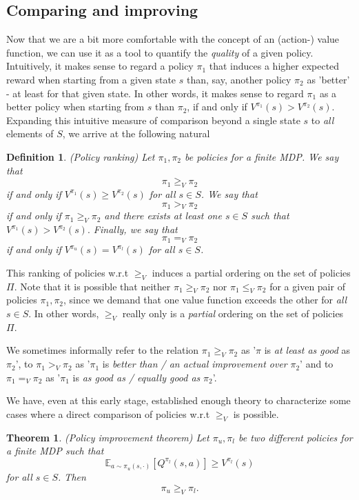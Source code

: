 \documentclass[11pt]{article} %
\newtheorem{thm}{Theorem}
\newtheorem{defn}{Definition}
\begin{document}
\subsection{Comparing and improving}

Now that we are a bit more comfortable with the concept of an (action-) value function, we can use it as a tool to quantify the \textit{quality} of a given policy. Intuitively, it makes sense to regard a policy $\pi_1$ that induces a higher expected reward when starting from a given state $s$ than, say, another policy $\pi_2$ as 'better'  - at least for that given state. In other words, it makes sense to regard $\pi_1$ as a better policy when starting from $s$ than $\pi_2$, if and only if $V^{\pi_1}(s) > V^{\pi_2}(s)$. Expanding this intuitive measure of comparison beyond a single state $s$ to \textit{all} elements of $S$, we arrive at the following natural

\begin{defn}{(Policy ranking)}
Let $\pi_1, \pi_2$ be policies for a finite MDP. We say that $$\pi_1 \ge_V \pi_2$$ if and only if $V^{\pi_1}(s) \ge V^{\pi_2}(s)$ for all $s \in S$. We say that $$\pi_1 >_V \pi_2$$ if and only if  $\pi_1 \ge_V \pi_2$ and there exists at least one $s \in S$ such that $V^{\pi_1}(s) > V^{\pi_2}(s).$ Finally, we say that $$\pi_1 =_V \pi_2$$ if and only if $V^{\pi_u}(s) = V^{\pi_l}(s)$ for all $s \in S$.
\end{defn}

This ranking of policies w.r.t $\ge_V$ induces a partial ordering on the set of policies $\Pi$. Note that it is possible that neither $\pi_1 \ge_V \pi_2$ nor $\pi_1 \le_V \pi_2$ for a given pair of policies $\pi_1,\pi_2$, since we demand that one value function exceeds the other for \textit{all} $s \in S$. In other words, $\ge_V$ really only is a \textit{partial} ordering on the set of policies $\Pi$.

We sometimes informally refer to the relation $\pi_1 \ge_V \pi_2$ as '$\pi$ is \textit{at least as good} as $\pi_2$', to $\pi_1 >_V \pi_2$ as '$\pi_1$ is \textit{better than / an actual improvement over} $\pi_2$' and to $\pi_1 =_V \pi_2$ as '$\pi_1$ is \textit{as good as / equally good as} $\pi_2$'.

We have, even at this early stage, established enough theory to characterize some cases where a direct comparison of policies w.r.t $\ge_V$ is possible.

\begin{thm}{(Policy improvement theorem)}
	Let $\pi_u, \pi_l$ be two different policies for a finite MDP such that $$ \mathbb{E}_{a \sim \pi_u(s,\cdot )}[Q^{\pi_l}(s,a)] \ge V^{\pi_l}(s)$$ for all $s \in S$. Then $$\pi_u \ge_V \pi_l.$$
\end{thm}
\end{document}
